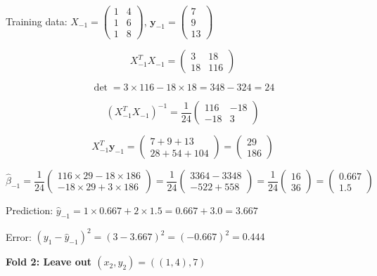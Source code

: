 \documentclass[12pt]{article}
\begin{document}
\begin{solution}
Training data: $X_{-1} = \begin{pmatrix} 1 & 4 \\ 1 & 6 \\ 1 & 8 \end{pmatrix}$, $\mathbf{y}_{-1} = \begin{pmatrix} 7 \\ 9 \\ 13 \end{pmatrix}$

\[X_{-1}^TX_{-1} = \begin{pmatrix} 3 & 18 \\ 18 & 116 \end{pmatrix}\]

\[\det = 3 \times 116 - 18 \times 18 = 348 - 324 = 24\]

\[(X_{-1}^TX_{-1})^{-1} = \frac{1}{24}\begin{pmatrix} 116 & -18 \\ -18 & 3 \end{pmatrix}\]

\[X_{-1}^T\mathbf{y}_{-1} = \begin{pmatrix} 7 + 9 + 13 \\ 28 + 54 + 104 \end{pmatrix} = \begin{pmatrix} 29 \\ 186 \end{pmatrix}\]

\[\hat{\beta}_{-1} = \frac{1}{24}\begin{pmatrix} 116 \times 29 - 18 \times 186 \\ -18 \times 29 + 3 \times 186 \end{pmatrix} = \frac{1}{24}\begin{pmatrix} 3364 - 3348 \\ -522 + 558 \end{pmatrix} = \frac{1}{24}\begin{pmatrix} 16 \\ 36 \end{pmatrix} = \begin{pmatrix} 0.667 \\ 1.5 \end{pmatrix}\]

Prediction: $\hat{y}_{-1} = 1 \times 0.667 + 2 \times 1.5 = 0.667 + 3.0 = 3.667$

Error: $(y_1 - \hat{y}_{-1})^2 = (3 - 3.667)^2 = (-0.667)^2 = 0.444$

\textbf{Fold 2: Leave out $(x_2, y_2) = ((1,4), 7)$}


\end{solution}
\end{document}
